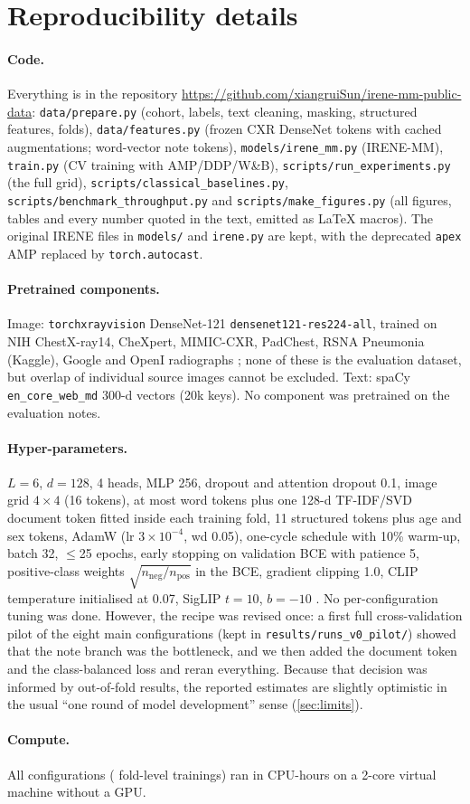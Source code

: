 \section{Reproducibility details}
\label{app:repro}

\paragraph{Code.} Everything is in the repository \url{https://github.com/xiangruiSun/irene-mm-public-data}:
\texttt{data/prepare.py} (cohort, labels, text cleaning, masking, structured features, folds),
\texttt{data/features.py} (frozen CXR DenseNet tokens with cached augmentations; word-vector note tokens),
\texttt{models/irene\_mm.py} (IRENE-MM), \texttt{train.py} (CV training with AMP/DDP/W\&B),
\texttt{scripts/run\_experiments.py} (the full grid),
\texttt{scripts/classical\_baselines.py}, \texttt{scripts/benchmark\_throughput.py} and
\texttt{scripts/make\_figures.py} (all figures, tables and every number quoted in the text,
emitted as LaTeX macros). The original IRENE files in \texttt{models/} and \texttt{irene.py} are
kept, with the deprecated \texttt{apex} AMP replaced by \texttt{torch.autocast}.

\paragraph{Pretrained components.} Image: \texttt{torchxrayvision} DenseNet-121
\texttt{densenet121-res224-all}, trained on NIH ChestX-ray14, CheXpert, MIMIC-CXR, PadChest,
RSNA Pneumonia (Kaggle), Google and OpenI radiographs \citep{cohen2022torchxrayvision}; none of these
is the evaluation dataset, but overlap of individual source images cannot be excluded.
Text: spaCy \texttt{en\_core\_web\_md} 300-d vectors (20k keys). No component was pretrained on the
evaluation notes.

\paragraph{Hyper-parameters.} $L{=}6$, $d{=}128$, 4 heads, MLP 256, dropout and attention dropout
0.1, image grid $4{\times}4$ (16 tokens), at most \MaxTxt{} word tokens plus one 128-d TF-IDF/SVD
document token fitted inside each training fold, 11 structured tokens plus age and sex tokens,
AdamW (lr $3{\times}10^{-4}$, wd 0.05), one-cycle schedule with 10\% warm-up, batch 32,
$\le$25 epochs, early stopping on validation BCE with patience 5, positive-class weights
$\sqrt{n_{\text{neg}}/n_{\text{pos}}}$ in the BCE, gradient clipping 1.0, CLIP temperature
initialised at 0.07, SigLIP $t{=}10$, $b{=}{-}10$ \citep{zhai2023siglip}. No per-configuration tuning
was done. However, the recipe was revised once: a first full cross-validation pilot of the eight
main configurations (kept in \texttt{results/runs\_v0\_pilot/}) showed that the note branch was
the bottleneck, and we then added the document token and the class-balanced loss and reran
everything. Because that decision was informed by out-of-fold results, the reported estimates
are slightly optimistic in the usual ``one round of model development'' sense
(\cref{sec:limits}).

\paragraph{Compute.} All \NRuns{} configurations (\NFoldRuns{} fold-level trainings) ran in
\CPUHours{} CPU-hours on a 2-core virtual machine without a GPU.
